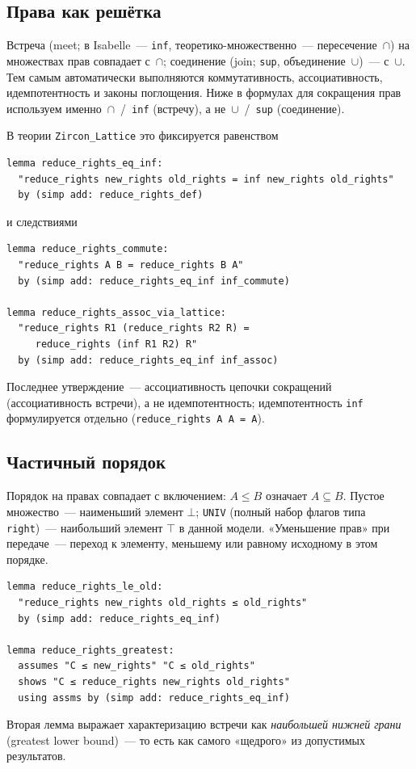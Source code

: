 \documentclass[11pt,a4paper]{article}
\begin{document}
\subsection{Права как решётка}

Встреча (meet; в Isabelle~--- \texttt{inf}, теоретико-множественно~---
пересечение~$\cap$) на множествах прав совпадает с~$\cap$; соединение
(join; \texttt{sup}, объединение~$\cup$)~--- с~$\cup$. Тем самым
автоматически выполняются коммутативность, ассоциативность,
идемпотентность и законы поглощения. Ниже в формулах для сокращения прав
используем именно~$\cap$~/~\texttt{inf} (встречу), а не~$\cup$~/~\texttt{sup}
(соединение).

В теории \texttt{Zircon\_Lattice} это фиксируется равенством
\begin{lstlisting}
lemma reduce_rights_eq_inf:
  "reduce_rights new_rights old_rights = inf new_rights old_rights"
  by (simp add: reduce_rights_def)
\end{lstlisting}
и следствиями
\begin{lstlisting}
lemma reduce_rights_commute:
  "reduce_rights A B = reduce_rights B A"
  by (simp add: reduce_rights_eq_inf inf_commute)

lemma reduce_rights_assoc_via_lattice:
  "reduce_rights R1 (reduce_rights R2 R) =
     reduce_rights (inf R1 R2) R"
  by (simp add: reduce_rights_eq_inf inf_assoc)
\end{lstlisting}
Последнее утверждение~--- ассоциативность цепочки сокращений
(ассоциативность встречи), а не идемпотентность; идемпотентность
\texttt{inf} формулируется отдельно (\texttt{reduce\_rights A A = A}).

\subsection{Частичный порядок}

Порядок на правах совпадает с включением: $A \le B$ означает
$A \subseteq B$. Пустое множество~--- наименьший элемент $\bot$;
\texttt{UNIV} (полный набор флагов типа \texttt{right})~--- наибольший
элемент $\top$ в данной модели. «Уменьшение прав» при передаче~---
переход к элементу, меньшему или равному исходному в этом порядке.

\begin{lstlisting}
lemma reduce_rights_le_old:
  "reduce_rights new_rights old_rights ≤ old_rights"
  by (simp add: reduce_rights_eq_inf)

lemma reduce_rights_greatest:
  assumes "C ≤ new_rights" "C ≤ old_rights"
  shows "C ≤ reduce_rights new_rights old_rights"
  using assms by (simp add: reduce_rights_eq_inf)
\end{lstlisting}
Вторая лемма выражает характеризацию встречи как \emph{наибольшей
	нижней грани} (greatest lower bound)~--- то есть как самого «щедрого»
из допустимых результатов.
\end{document}
